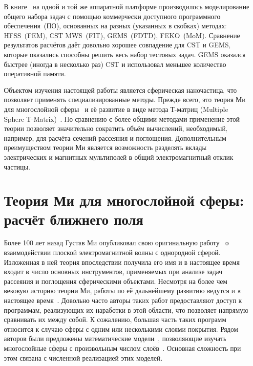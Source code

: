 В книге~\cite{Yu-Advanced-FDTD-2011} на одной и той же аппаратной
платформе производилось моделирование общего набора задач с помощью
коммерчески доступного программного обеспечения~(ПО), основанных на разных
(указанных в скобках) методах: HFSS~(FEM), CST MWS~(FIT), GEMS~(FDTD),
FEKO~(MoM). Сравнение результатов расчётов даёт довольно хорошее
совпадение для CST и GEMS, которые оказались способны решить весь
набор тестовых задач. GEMS оказался быстрее (иногда в несколько раз)
CST и использовал меньшее количество оперативной памяти.

Объектом изучения настоящей работы является сферическая наночастица,
что позволяет применять специализированные методы. Прежде
всего, это теория Ми для многослойной сферы~\cite{Yang-2003} и её
развитие в виде метода Т-матриц (Multiple Sphere
T-Matrix)~\cite{MacKowski-2012}.  По сравнению с более общими методами
применение этой теории позволяет значительно сократить объём
вычислений, необходимый, например, для расчёта сечений рассеяния и
поглощения.  Дополнительным преимуществом теории Ми является
возможность разделять вклады электрических и магнитных мультиполей в
общий электромагнитный отклик частицы.


\section{Теория Ми для многослойной сферы: расчёт ближнего поля}
\label{sec:Mie}

Более 100 лет назад Густав Ми опубликовал свою оригинальную
работу~\cite{Mie-1908} о взаимодействии плоской электромагнитной волны
с однородной сферой.  Изложенная в ней теория впоследствии получила
его имя и в настоящее время входит в число основных инструментов,
применяемых при анализе задач рассеяния и поглощения сферическими
объектами.  Несмотря на более чем вековую историю теории Ми, работы по
её дальнейшему развитию ведутся и в настоящее время~\cite{Suzuki-2008,
  MacKowski-2012, Lerme-2000, Xu-2005, Li-2006, Gogoi-2010,
  Santiago-2011}.  Довольно часто авторы таких работ предоставляют
доступ к программам, реализующих их наработки в этой области, что
позволяет напрямую сравнивать их между собой.  К сожалению, большая
часть таких программ относится к случаю сферы с одним или несколькими слоями покрытия. Рядом авторов были
предложены математические модели~\cite{Yang-2003,
  Pena-scattnlay-2009}, позволяющие изучать многослойные сферы с
произвольным числом слоёв~\cite{Sheehan-2013,Selmke-2012}.  Основная
сложность при этом связана с численной реализацией этих моделей.

